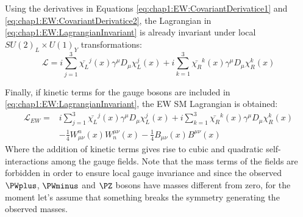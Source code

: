 Using the derivatives in Equations \ref{eq:chap1:EW:CovariantDerivatice1} and \ref{eq:chap1:EW:CovariantDerivatice2}, the Lagrangian 
in \ref{eq:chap1:EW:LagrangianInvariant} is already invariant under local $SU(2)_{L} \times U(1)_{Y}$ transformations:
\begin{equation}\label{eq:chap1:EW:LagrangianInvariant}
	\mathcal{L} = i \sum_{j=1}^{3} \bar{\chi_{L}}^{j}(x) \gamma^{\mu} D_{\mu} \chi_{L}^{j}(x)+  i \sum_{k=1}^{3} \bar{\chi_{R}}^{k}(x) \gamma^{\mu} D_{\mu} \chi_{R}^{k}(x) 
\end{equation}

Finally, if kinetic terms for the gauge bosons are included in \ref{eq:chap1:EW:LagrangianInvariant}, the EW SM Lagrangian is obtained:
\begin{equation}
\begin{split}\label{eq:chap1:EW:FinalL}
	\mathcal{L}_{EW}  =	& i \sum_{j=1}^{3} \bar{\chi_{L}}^{j}(x) \gamma^{\mu} D_{\mu} \chi_{L}^{j}(x)+  i \sum_{k=1}^{3} \bar{\chi_{R}}^{k}(x) \gamma^{\mu} D_{\mu} \chi_{R}^{k}(x) \\
					& - \frac{1}{4} W^{n}_{\mu \nu}(x)W_{n}^{\mu \nu}(x) - \frac{1}{4} B_{\mu \nu}(x)B^{\mu \nu}(x)
\end{split}
\end{equation}
Where the addition of kinetic terms gives rise to cubic and quadratic self-interactions among the gauge fields.
Note that the mass terms of the fields are forbidden in order to ensure local gauge invariance and
since the observed $\PWplus$, $\PWminus$ and $\PZ$ bosons have masses different from zero, 
 for the moment let's assume that something breaks the symmetry generating the observed masses.


